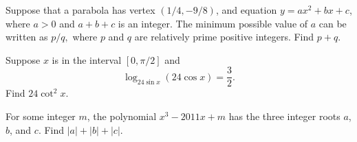 \documentclass[11pt]{article}
\theoremstyle{definition}
\begin{document}
%	











\begin{question}[name={2011 AIME I, \href{https://artofproblemsolving.com/community/c4p2209689}{Problem 6}}]
	Suppose that a parabola has vertex $\left({1}/{4},-{9}/{8}\right)$, and equation $y=ax^2+bx+c$, where $a>0$ and $a+b+c$ is an integer. The minimum possible value of $a$ can be written as ${p}/{q},$ where $p$ and $q$ are relatively prime positive integers. Find $p+q$.
\end{question}


%	













\begin{question}[name={2011 AIME I, \href{https://artofproblemsolving.com/community/c4p2209695}{Problem 9}}]
	Suppose $x$ is in the interval $[0,\pi/2]$ and $$\log_{24\sin{x}}(24\cos{x})=\frac{3}{2}.$$
	Find $24\cot^2{x}$.
\end{question}


%	








\begin{question}[name={2011 AIME I, \href{https://artofproblemsolving.com/community/c4p2209754}{Problem 15}}]
	For some integer $m$, the polynomial $x^3-2011x+m$ has the three integer roots $a$, $b$, and $c$. Find $|a|+|b|+|c|$.
\end{question}


%	
\end{document}
